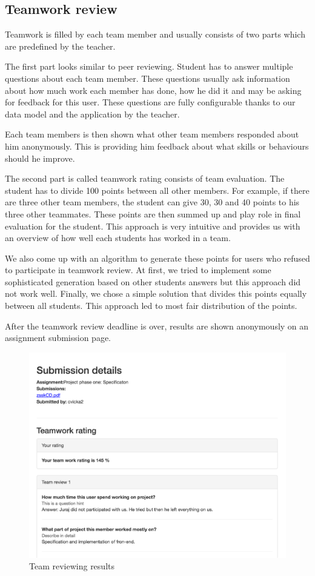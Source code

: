 \subsection{Teamwork review}
\label{sec:teamreview}
Teamwork is filled by each team member and usually consists of two parts which are predefined by the teacher. 

The first part looks similar to peer reviewing. Student has to answer multiple questions about each team member. These questions usually ask information about how much work each member has done, how he did it and may be asking for feedback for this user. These questions are fully configurable thanks to our data model and the application by the teacher.

Each team members is then shown what other team members responded about him anonymously. This is providing him feedback about what skills or behaviours should he improve.

The second part is called teamwork rating consists of team evaluation. The student has to divide 100 points between all other members. For example, if there are three other team members, the student can give 30, 30 and 40 points to his three other teammates. These points are then summed up and play role in final evaluation for the student. This approach is very intuitive and provides us with an overview of how well each students has worked in a team.

We also come up with an algorithm to generate these points for users who refused to participate in teamwork review. At first, we tried to implement some sophisticated generation based on other students answers but this approach did not work well. Finally, we chose a simple solution that divides this points equally between all students. This approach led to most  fair distribution of the points.

After the teamwork review deadline is over, results are shown anonymously on an assignment submission page. 

\begin{figure}[h]
    \centering
    \includegraphics[width=\textwidth]{images/teamreview.png}
    \caption{Team reviewing results}
    \label{team_reviewing}
\end{figure}


